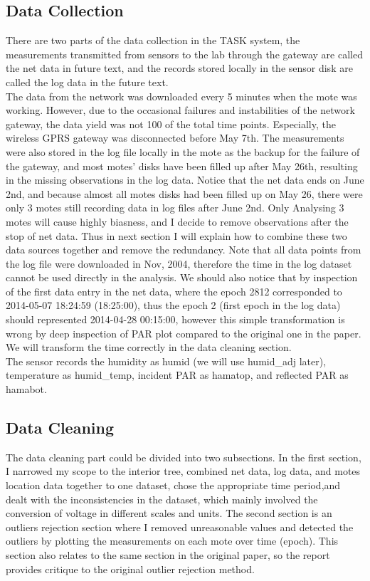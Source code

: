 \documentclass[11pt]{article}
\begin{document}
{\subsection{Data Collection}
There are two parts of the data collection in the TASK system, the measurements transmitted from sensors to the lab through the gateway are called the net data in future text, and the records stored locally in the sensor disk are called the log data in the future text.\\
The data from the network was downloaded every 5 minutes when the mote was working. However, due to the occasional failures and instabilities of the network gateway, the data yield was not 100 of the total time points. Especially, the wireless GPRS gateway was disconnected before May 7th. The measurements were also stored in the log file locally in the mote as the backup for the failure of the gateway, and most motes' disks have been filled up after May 26th, resulting in the missing observations in the log data. Notice that the net data ends on June 2nd, and because almost all motes disks had been filled up on May 26, there were only 3 motes still recording data in log files after June 2nd. Only Analysing 3 motes will cause highly biasness, and I decide to remove observations after the stop of net data. Thus in next section I will explain how to combine these two data sources together and remove the redundancy. Note that all data points from the log file were downloaded in Nov, 2004, therefore the time in the log dataset cannot be used directly in the analysis. We should also notice that by inspection of the first data entry in the net data, where the epoch 2812 corresponded to 2014-05-07 18:24:59 (18:25:00), thus the epoch 2 (first epoch in the log data) should represented 2014-04-28 00:15:00, however this simple transformation is wrong by deep inspection of PAR plot compared to the original one in the paper. We will transform the time correctly in the data cleaning section.\\
The sensor records the humidity as humid (we will use humid\_adj later), temperature as humid\_temp, incident PAR as hamatop, and reflected PAR as hamabot.

\subsection{Data Cleaning}
The data cleaning part could be divided into two subsections. In the first section, I narrowed my scope to the interior tree, combined net data, log data, and motes location data together to one dataset, chose the appropriate time period,and dealt with the inconsistencies in the dataset, which mainly involved the conversion of voltage in different scales and units. The second section is an outliers rejection section where I removed unreasonable values and detected the outliers by plotting the measurements on each mote over time (epoch). This section also relates to the same section in the original paper, so the report provides critique to the original outlier rejection method.
}
\end{document}
